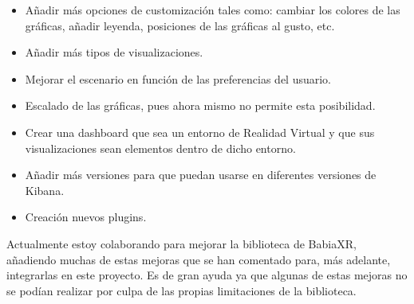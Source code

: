 \documentclass[a4paper, 12pt]{book}
\begin{document}
 \begin{itemize}
     \item Añadir más opciones de customización tales como: cambiar los colores de las gráficas, añadir leyenda, posiciones de las gráficas al gusto, etc.
     \item Añadir más tipos de visualizaciones.
     \item Mejorar el escenario en función de las preferencias del usuario.
     \item Escalado de las gráficas, pues ahora mismo no permite esta posibilidad.
     \item Crear una dashboard que sea un entorno de Realidad Virtual y que sus visualizaciones sean elementos dentro de dicho entorno.
     \item Añadir más versiones para que puedan usarse en diferentes versiones de Kibana.
     \item Creación nuevos plugins.
 \end{itemize}
 
 Actualmente estoy colaborando para mejorar la biblioteca de BabiaXR, añadiendo muchas de estas mejoras que se han comentado para, más adelante, integrarlas en este proyecto. Es de gran ayuda ya que algunas de estas mejoras no se podían realizar por culpa de las propias limitaciones de la biblioteca.



%

%
\end{document}
